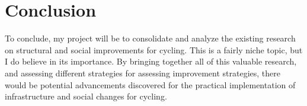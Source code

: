 \documentclass[12pt, letterpaper]{article}
\begin{document}
\section{Conclusion}
\label{sec:conclusion}

To conclude, my project will be to consolidate and analyze the existing research on structural and social improvements for cycling. This is a fairly niche topic, but I do believe in its importance. By bringing together all of this valuable research, and assessing different strategies for assessing improvement strategies, there would be potential advancements discovered for the practical implementation of infrastructure and social changes for cycling. 




\end{document}
